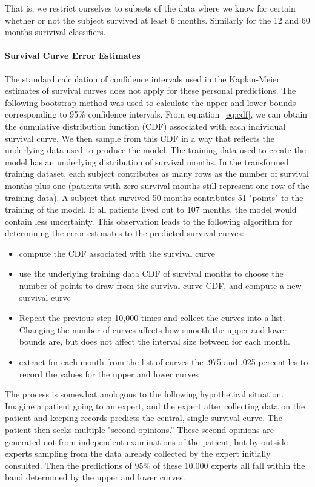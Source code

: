 \documentclass[10pt,letterpaper]{article}
\begin{document}
That is, we restrict ourselves to subsets of the data where we know for certain whether or not the subject survived at least 6 months. Similarly for the 12 and 60 months surivival classifiers. 

\paragraph{Survival Curve Error Estimates}
The standard calculation of confidence intervals used in the Kaplan-Meier estimates of survival curves does not apply for these personal predictions. The following bootstrap method was used to calculate the upper and lower bounds corresponding to 95\% confidence intervals.
From equation~\ref{eq:cdf}, we can obtain the cumulative distribution function (CDF) associated with each individual survival curve.
We then sample from this CDF in a way that reflects the underlying data used to produce the model. The training data used to create the model has an underlying distribution of survival months. In the transformed training dataset, each subject contributes as many rows as the number of survival months plus one (patients with zero survival months still represent one row of the training data). A subject that survived 50 months contributes 51 "points" to the training of the model. If all patients lived out to 107 months, the model would contain less uncertainty. This observation leads to the following algorithm for determining the error estimates to the predicted survival curves:

\begin{itemize}[noitemsep]
\item compute the CDF associated with the survival curve
\item use the underlying training data CDF of survival months to choose the number of points
to draw from the survival curve CDF, and compute a new survival curve 
\item Repeat the previous step 10,000 times and collect the curves into a list. Changing the number of curves affects how smooth the upper and lower bounds are, but does not affect the interval size between for each month.
\item extract for each month from the list of curves the .975 and .025 percentiles to record the values for the upper and lower curves
\end{itemize}

The process is somewhat anologous to the following hypothetical situation. Imagine a patient going to an expert, and the expert after collecting data on the patient and keeping records predicts the central, single survival curve. The patient then seeks multiple "second opinions.'' These second opinions are generated not from independent examinations of the patient, but by outside experts sampling from the data already collected by the expert initially consulted. 
Then the predictions of 95\% of these 10,000 experts all fall within the band determined by the upper and lower curves.
\end{document}
